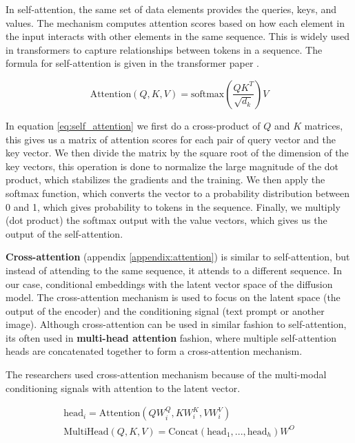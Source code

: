 In self-attention, the same set of data elements provides the queries, keys, and values. The mechanism computes attention scores based on how each element in the input interacts with other elements in the same sequence. This is widely used in transformers to capture relationships between tokens in a sequence. The formula for self-attention is given in the transformer paper \cite{transformer}.

\begin{equation}
    \text{Attention}(Q, K, V) = \text{softmax} \left( \frac{QK^T}{\sqrt{d_k}} \right) V
    \label{eq:self_attention}
\end{equation}

In equation \ref{eq:self_attention} we first do a cross-product of $Q$ and $K$ matrices, this gives us a matrix of attention scores for each pair of query vector and the key vector. We then divide the matrix by the square root of the dimension of the key vectors, this operation is done to normalize the large magnitude of the dot product, which stabilizes the gradients and the training. We then apply the softmax function, which converts the vector to a probability distribution between 0 and 1, which gives probability to tokens in the sequence. Finally, we multiply (dot product) the softmax output with the value vectors, which gives us the output of the self-attention.

\textbf{Cross-attention} (appendix \ref{appendix:attention}) is similar to self-attention, but instead of attending to the same sequence, it attends to a different sequence. In our case, conditional embeddings with the latent vector space of the diffusion model. The cross-attention mechanism is used to focus on the latent space (the output of the encoder) and the conditioning signal (text prompt or another image). Although cross-attention can be used in similar fashion to self-attention, its often used in \textbf{multi-head attention} fashion, where multiple self-attention heads are concatenated together to form a cross-attention mechanism.

The researchers used cross-attention mechanism because of the multi-modal conditioning signals with attention to the latent vector.

\begin{equation}
    \begin{aligned}
        \text{head}_i = \text{Attention}(QW_i^Q, KW_i^K, VW_i^V)  \\
        \text{MultiHead}(Q, K, V) = \text{Concat}(\text{head}_1, ..., \text{head}_h)W^O
    \end{aligned}
    \label{eq:stable_diffusion_multihead_crossattention}
\end{equation}

